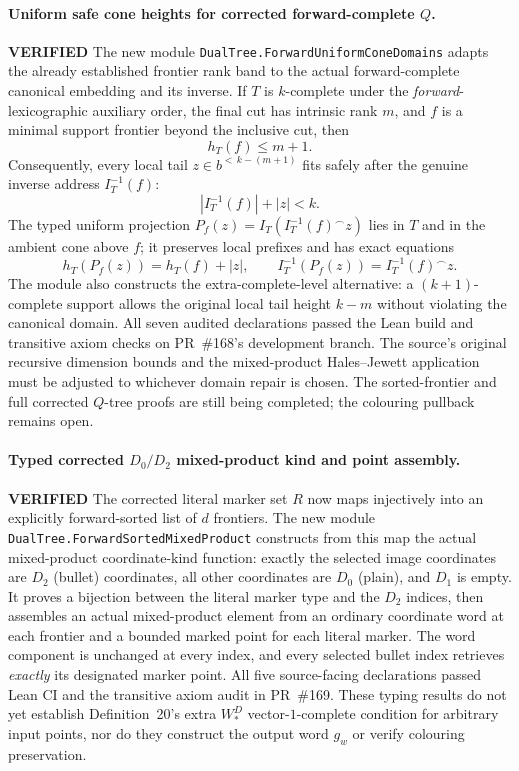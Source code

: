 \documentclass[11pt]{article}
\newcommand{\ok}{\textcolor{green!40!black}{\textbf{VERIFIED}}}
\newcommand{\lean}[1]{\texttt{#1}}
\begin{document}
\paragraph{Uniform safe cone heights for corrected forward-complete $Q$.} \ok
The new module \lean{DualTree.ForwardUniformConeDomains}
adapts the already established frontier rank
band to the actual forward-complete
canonical embedding and its inverse.
If $T$ is $k$-complete under the
\emph{forward}-lexicographic auxiliary
order, the final cut has intrinsic
rank $m$, and $f$ is a minimal
support frontier beyond the inclusive
cut, then
\[
 h_T(f)\le m+1.
\]
Consequently, every local tail
$z\in b^{<\,k-(m+1)}$ fits safely
after the genuine inverse address
$I_T^{-1}(f)$:
\[
 |I_T^{-1}(f)|+|z|<k.
\]
The typed uniform projection
$P_f(z)=I_T(I_T^{-1}(f)^\frown z)$
lies in $T$ and in the ambient
cone above $f$; it preserves local
prefixes and has exact equations
\[
 h_T(P_f(z))=h_T(f)+|z|,
 \qquad
 I_T^{-1}(P_f(z))=I_T^{-1}(f)^\frown z.
\]
The module also constructs the
extra-complete-level alternative:
a $(k+1)$-complete support allows
the original local tail height
$k-m$ without violating the
canonical domain.
All seven audited declarations passed the Lean build and transitive
axiom checks on PR~\#168's development branch.
The source's original recursive
dimension bounds and the
mixed-product Hales--Jewett
application must be adjusted
to whichever domain repair is
chosen. The sorted-frontier and
full corrected $Q$-tree proofs
are still being completed; the
colouring pullback remains open.

\paragraph{Typed corrected $D_0/D_2$ mixed-product kind and point assembly.} \ok
The corrected literal marker set $R$ now
maps injectively into an explicitly
forward-sorted list of $d$ frontiers.
The new module
\lean{DualTree.ForwardSortedMixedProduct}
constructs from this map the actual
mixed-product coordinate-kind function:
exactly the selected image coordinates
are $D_2$ (bullet) coordinates,
all other coordinates are $D_0$
(plain), and $D_1$ is empty.
It proves a bijection between the
literal marker type and the $D_2$
indices, then assembles an actual
mixed-product element from an
ordinary coordinate word at each
frontier and a bounded marked
point for each literal marker.
The word component is unchanged
at every index, and every selected
bullet index retrieves \emph{exactly}
its designated marker point.
All five source-facing declarations passed Lean CI and the transitive
axiom audit in PR~\#169.
These typing results do not yet
establish Definition~20's extra
$W^D_*$ vector-$1$-complete
condition for arbitrary input
points, nor do they construct
the output word $g_w$ or verify
colouring preservation.
\end{document}
